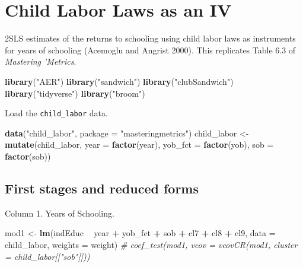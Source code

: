 \documentclass[]{book}
\newenvironment{Shaded}{\begin{snugshade}}{\end{snugshade}}
\newcommand{\KeywordTok}[1]{\textcolor[rgb]{0.13,0.29,0.53}{\textbf{#1}}}
\newcommand{\DataTypeTok}[1]{\textcolor[rgb]{0.13,0.29,0.53}{#1}}
\newcommand{\StringTok}[1]{\textcolor[rgb]{0.31,0.60,0.02}{#1}}
\newcommand{\CommentTok}[1]{\textcolor[rgb]{0.56,0.35,0.01}{\textit{#1}}}
\newcommand{\OperatorTok}[1]{\textcolor[rgb]{0.81,0.36,0.00}{\textbf{#1}}}
\newcommand{\NormalTok}[1]{#1}
\theoremstyle{definition}
\theoremstyle{definition}
\theoremstyle{definition}
\theoremstyle{remark}
\begin{document}
\chapter{Child Labor Laws as an IV}\label{child-labor-laws-as-an-iv}

2SLS estimates of the returns to schooling using child labor laws as
instruments for years of schooling (Acemoglu and Angrist 2000). This
replicates Table 6.3 of \emph{Mastering 'Metrics}.

\begin{Shaded}
\begin{Highlighting}[]
\KeywordTok{library}\NormalTok{(}\StringTok{"AER"}\NormalTok{)}
\KeywordTok{library}\NormalTok{(}\StringTok{"sandwich"}\NormalTok{)}
\KeywordTok{library}\NormalTok{(}\StringTok{"clubSandwich"}\NormalTok{)}
\KeywordTok{library}\NormalTok{(}\StringTok{"tidyverse"}\NormalTok{)}
\KeywordTok{library}\NormalTok{(}\StringTok{"broom"}\NormalTok{)}
\end{Highlighting}
\end{Shaded}

Load the \texttt{child\_labor} data.

\begin{Shaded}
\begin{Highlighting}[]
\KeywordTok{data}\NormalTok{(}\StringTok{"child_labor"}\NormalTok{, }\DataTypeTok{package =} \StringTok{"masteringmetrics"}\NormalTok{)}
\NormalTok{child_labor <-}\StringTok{ }\KeywordTok{mutate}\NormalTok{(child_labor,}
                      \DataTypeTok{year =} \KeywordTok{factor}\NormalTok{(year),}
                      \DataTypeTok{yob_fct =} \KeywordTok{factor}\NormalTok{(yob),}
                      \DataTypeTok{sob =} \KeywordTok{factor}\NormalTok{(sob))}
\end{Highlighting}
\end{Shaded}

\section{First stages and reduced
forms}\label{first-stages-and-reduced-forms}

Column 1. Years of Schooling.

\begin{Shaded}
\begin{Highlighting}[]
\NormalTok{mod1 <-}\StringTok{ }\KeywordTok{lm}\NormalTok{(indEduc }\OperatorTok{~}\StringTok{ }\NormalTok{year }\OperatorTok{+}\StringTok{ }\NormalTok{yob_fct }\OperatorTok{+}\StringTok{ }\NormalTok{sob }\OperatorTok{+}\StringTok{ }\NormalTok{cl7 }\OperatorTok{+}\StringTok{ }\NormalTok{cl8 }\OperatorTok{+}\StringTok{ }\NormalTok{cl9,}
           \DataTypeTok{data =}\NormalTok{ child_labor, }\DataTypeTok{weights =}\NormalTok{ weight)}
\CommentTok{# coef_test(mod1, vcov = vcovCR(mod1, cluster = child_labor[["sob"]]))}
\end{Highlighting}
\end{Shaded}
\end{document}
